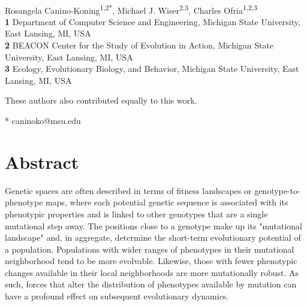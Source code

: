 \documentclass[10pt,letterpaper]{article}
\date{}
\begin{document}
\vspace*{0.2in}

\begin{flushleft}
{\Large
\textbf{} %
}
\newline
\\
Rosangela Canino-Koning\textsuperscript{1,2*},
Michael J. Wiser\textsuperscript{2,3},
Charles Ofria\textsuperscript{1,2,3\ddag}
\\
\bigskip
\textbf{1} Department of Computer Science and Engineering, Michigan State University, East Lansing, MI, USA
\\
\textbf{2} BEACON Center for the Study of Evolution in Action, Michigan State University, East Lansing, MI, USA
\\
\textbf{3} Ecology, Evolutionary Biology, and Behavior, Michigan State University, East Lansing, MI, USA
\\
\bigskip

\ddag These authors also contributed equally to this work.

* caninoko@msu.edu

\end{flushleft}
\section*{Abstract}
Genetic spaces are often described in terms of fitness landscapes or genotype-to-phenotype maps, where each potential genetic sequence is associated with its phenotypic properties and is linked to other genotypes that are a single mutational step away.  The positions close to a genotype make up its "mutational landscape" and, in aggregate, determine the short-term evolutionary potential of a population.
Populations with wider ranges of phenotypes in their mutational neighborhood tend to be more evolvable. Likewise, those with fewer phenotypic changes available in their local neighborhoods are more mutationally robust. As such, forces that alter the distribution of phenotypes available by mutation can have a profound effect on subsequent evolutionary dynamics.
\end{document}
